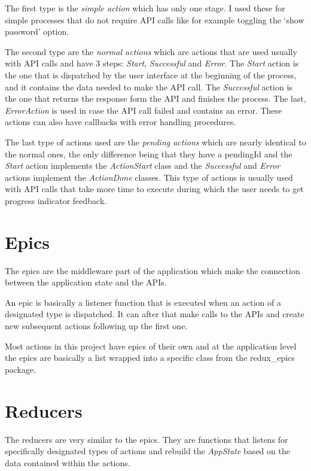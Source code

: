 \documentclass[a4paper,12pt]{report}
\begin{document}
The first type is the \textit{simple action} which has only one stage. I used
these for simple processes that do not require API calls like for example
toggling the `show password' option.

The second type are the \textit{normal actions} which are actions that are used
usually with API calls and have 3 steps: \textit{Start}, \textit{Successful}
and \textit{Error}. The \textit{Start} action is the one that is dispatched by
the user interface at the beginning of the process, and it contains the data
needed to make the API call. The \textit{Successful} action is the one that
returns the response form the API and finishes the process. The last,
\textit{ErrorAction} is used in case the API call failed and contains an error.
These actions can also have callbacks with error handling procedures.

The last type of actions used are the \textit{pending actions} which are nearly
identical to the normal ones, the only difference being that they have a
pendingId and the \textit{Start} action implements the \textit{ActionStart}
class and the \textit{Successful} and \textit{Error} actions implement the
\textit{ActionDone} classes. This type of actions is usually used with API
calls that take more time to execute during which the user needs to get
progress indicator feedback.

\section{Epics}

The epics are the middleware part of the application which make the connection
between the application state and the APIs.

An epic is basically a listener function that is executed when an action of a
designated type is dispatched. It can after that make calls to the APIs and
create new subsequent actions following up the first one.

Most actions in this project have epics of their own and at the application
level the epics are basically a list wrapped into a specific class from the
redux\_epics\cite{reduxEpicsDocs} package.

\section{Reducers}

The reducers are very similar to the epics. They are functions that listens for
specifically designated types of actions and rebuild the \textit{AppState}
based on the data contained within the actions.
\end{document}
